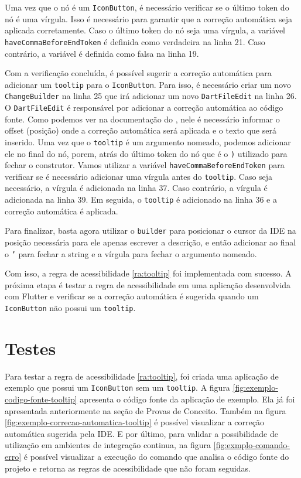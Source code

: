 Uma vez que o nó é um \texttt{IconButton}, é necessário verificar se o último token do nó é uma vírgula. Isso é necessário para garantir que a correção automática seja aplicada corretamente. Caso o último token do nó seja uma vírgula, a variável \texttt{haveCommaBeforeEndToken} é definida como verdadeira na linha 21. Caso contrário, a variável é definida como falsa na linha 19.

Com a verificação concluída, é possível sugerir a correção automática para adicionar um \texttt{tooltip} para o \texttt{IconButton}. Para isso, é necessário criar um novo \texttt{ChangeBuilder} na linha 25 que irá adicionar um novo \texttt{DartFileEdit} na linha 26. O \texttt{DartFileEdit} é responsável por adicionar a correção automática ao código fonte. Como podemos ver na documentação do \cite{customlintbuilder}, nele é necessário informar o offset (posição) onde a correção automática será aplicada e o texto que será inserido. Uma vez que o \texttt{tooltip} é um argumento nomeado, podemos adicionar ele no final do nó, porem, atrás do último token do nó que é o \texttt{)} utilizado para fechar o construtor. Vamos utilizar a variável \texttt{haveCommaBeforeEndToken} para verificar se é necessário adicionar uma vírgula antes do \texttt{tooltip}. Caso seja necessário, a vírgula é adicionada na linha 37. Caso contrário, a vírgula é adicionada na linha 39. Em seguida, o \texttt{tooltip} é adicionado na linha 36 e a correção automática é aplicada.

Para finalizar, basta agora utilizar o \texttt{builder} para posicionar o cursor da IDE na posição necessária para ele apenas escrever a descrição, e então adicionar ao final o \texttt{'} para fechar a string e a vírgula para fechar o argumento nomeado.

Com isso, a regra de acessibilidade \ref{ra:tooltip} foi implementada com sucesso. A próxima etapa é testar a regra de acessibilidade em uma aplicação desenvolvida com Flutter e verificar se a correção automática é sugerida quando um \texttt{IconButton} não possui um \texttt{tooltip}.

\section{Testes}

Para testar a regra de acessibilidade \ref{ra:tooltip}, foi criada uma aplicação de exemplo que possui um \texttt{IconButton} sem um \texttt{tooltip}. A figura \ref{fig:exemplo-codigo-fonte-tooltip} apresenta o código fonte da aplicação de exemplo. Ela já foi apresentada anteriormente na seção de Provas de Conceito. Também na figura \ref{fig:exemplo-correcao-automatica-tooltip} é possível visualizar a correção automática sugerida pela IDE. E por último, para validar a possibilidade de utilização em ambientes de integração continua, na figura \ref{fig:exmplo-comando-erro} é possível visualizar a execução do comando  que analisa o código fonte do projeto e retorna as regras de acessibilidade que não foram seguidas.


